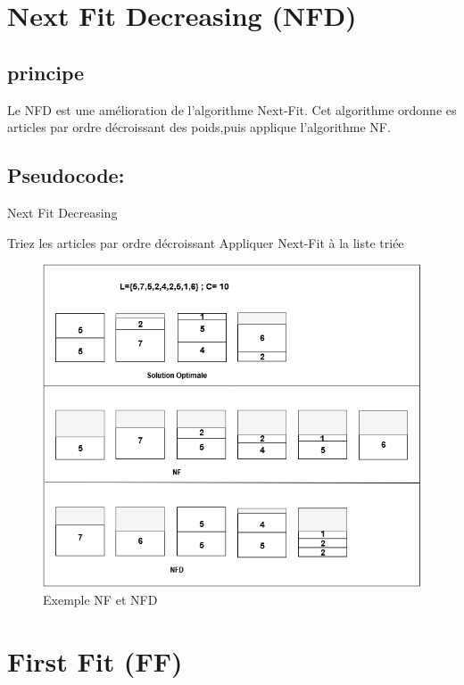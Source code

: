 \documentclass[class=article, crop=false]{standalone}
\begin{document}
\section{Next Fit Decreasing (NFD)}
\subsection{principe}
Le NFD est une amélioration de l’algorithme Next-Fit. Cet algorithme ordonne es articles par
 ordre décroissant des poids,puis applique l’algorithme NF.

\subsection{Pseudocode:}
\begin{algorithm}[!h]
    \caption{Next Fit Decreasing }
    \begin{algorithmic}
        \STATE Triez les articles par ordre décroissant\;
        \STATE Appliquer Next-Fit à la liste triée\;
    \end{algorithmic}
\end{algorithm}

\begin{figure}[H]
    \includegraphics[width=\linewidth]{../figures/NF NFD better(1).png}
    \caption{Exemple NF et NFD}
\end{figure}
\section{First Fit (FF)}
\end{document}
